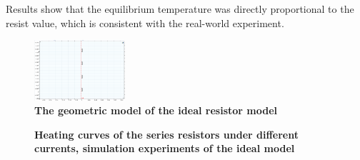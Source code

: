 \documentclass[10pt,a4paper,twocolumn,twoside,UTF8]{article}
\begin{document}
	Results show that the equilibrium temperature was directly proportional to the resist value, which is consistent with the real-world experiment.

	\begin{figure}[htbp]
		\centering
		\includegraphics[width=0.3\textwidth]{attachments/fig.1.2.0.png}
		\caption{\textbf{The geometric model of the ideal resistor model}}
		\label{fig.1.2.0}
	\end{figure}
	
	\begin{figure}[htbp]
		\centering

		\caption{\textbf{Heating curves of the series resistors under different currents, simulation experiments of the ideal model}}
		\label{fig.1.2.1}
	\end{figure}
\end{document}
